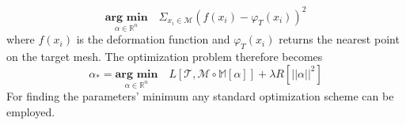 \begin{equation}
    \underset{\alpha \in \mathbb{R}^n}{\textbf{arg min}}\quad \Sigma_{x_{i} \in \mathcal{M}} (f(x_{i}) - \varphi_{T}(x_{i}))^2
\end{equation}
where $f(x_{i})$ is the deformation function and $\varphi_{T}(x_{i})$ returns the nearest point on the target mesh. The optimization problem therefore becomes
\begin{equation}
    \alpha_{*} = \underset{\alpha \in \mathbb{R}^n}{\textbf{arg min}}\quad L[\mathcal{T}, \mathcal{M }\circ \mathbb{M}[\alpha]]+\lambda R[\left|\left|\alpha\right|\right|^{2}]
\end{equation}
For finding the parameters' minimum any standard optimization scheme can be employed.

